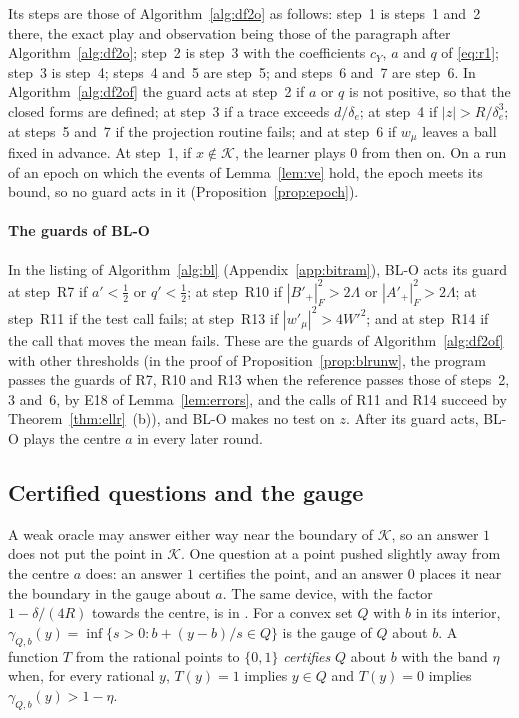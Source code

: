 \documentclass[11pt]{amsart}
\theoremstyle{definition}
\numberwithin{equation}{section}
\newcommand{\cK}{\mathcal{K}}
\begin{document}
Its steps are those of Algorithm~\ref{alg:df2o} as follows: step~1 is steps~1 and~2 there, the exact play and observation being those of the paragraph after Algorithm~\ref{alg:df2o}; step~2 is step~3 with the coefficients $c_Y$, $a$ and $q$ of \eqref{eq:r1}; step~3 is step~4; steps~4 and~5 are step~5; and steps~6 and~7 are step~6. In Algorithm~\ref{alg:df2of} the guard acts at step~2 if $a$ or $q$ is not positive, so that the closed forms are defined; at step~3 if a trace exceeds $d/\delta_e$; at step~4 if $|z|>R/\delta_e^3$; at steps~5 and~7 if the projection routine fails; and at step~6 if $w_\mu$ leaves a ball fixed in advance. At step~1, if $x\notin\cK$, the learner plays $0$ from then on. On a run of an epoch on which the events of Lemma~\ref{lem:ve} hold, the epoch meets its bound, so no guard acts in it (Proposition~\ref{prop:epoch}).

\paragraph{The guards of BL-O} In the listing of Algorithm~\ref{alg:bl} (Appendix~\ref{app:bitram}), BL-O acts its guard at step~R7 if $a'<\frac12$ or $q'<\frac12$; at step~R10 if $|B'_+|_F^2>2\Lambda$ or $|A'_+|_F^2>2\Lambda$; at step~R11 if the test call fails; at step~R13 if $|w'_\mu|^2>4W'^2$; and at step~R14 if the call that moves the mean fails. These are the guards of Algorithm~\ref{alg:df2of} with other thresholds (in the proof of Proposition~\ref{prop:blrunw}, the program passes the guards of R7, R10 and R13 when the reference passes those of steps~2, 3 and~6, by E18 of Lemma~\ref{lem:errors}, and the calls of R11 and R14 succeed by Theorem~\ref{thm:ellr}~(b)), and BL-O makes no test on $z$. After its guard acts, BL-O plays the centre $a$ in every later round.

\subsection{Certified questions and the gauge}\label{sec:bit-cm}

A weak oracle may answer either way near the boundary of $\cK$, so an answer $1$ does not put the point in $\cK$. One question at a point pushed slightly away from the centre $a$ does: an answer $1$ certifies the point, and an answer $0$ places it near the boundary in the gauge about $a$. The same device, with the factor $1-\delta/(4R)$ towards the centre, is in \cite[Lemma~(4.3.3)]{GLS93}. For a convex set $Q$ with $b$ in its interior, $\gamma_{Q,b}(y)=\inf\{s>0:b+(y-b)/s\in Q\}$ is the gauge of $Q$ about $b$. A function $T$ from the rational points to $\{0,1\}$ \emph{certifies} $Q$ about $b$ with the band $\eta$ when, for every rational $y$, $T(y)=1$ implies $y\in Q$ and $T(y)=0$ implies $\gamma_{Q,b}(y)>1-\eta$.
\end{document}
